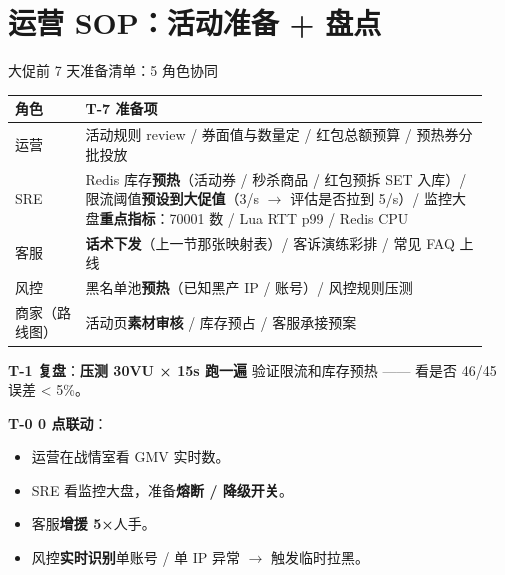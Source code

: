 \documentclass[aspectratio=169,11pt]{beamer}
\begin{document}
\section{运营 SOP：活动准备 + 盘点}

\begin{frame}[allowframebreaks]{大促前 7 天准备清单：5 角色协同}
\scriptsize
\begin{tabular}{@{}p{0.14\linewidth}p{0.80\linewidth}@{}}
\toprule
角色 & T-7 准备项 \\
\midrule
运营 & 活动规则 review / 券面值与数量定 / 红包总额预算 / 预热券分批投放 \\
SRE & Redis 库存\textbf{预热}（活动券 / 秒杀商品 / 红包预拆 SET 入库）/ 限流阈值\textbf{预设到大促值}（3/s $\to$ 评估是否拉到 5/s）/ 监控大盘\textbf{重点指标}：70001 数 / Lua RTT p99 / Redis CPU \\
客服 & \textbf{话术下发}（上一节那张映射表）/ 客诉演练彩排 / 常见 FAQ 上线 \\
风控 & 黑名单池\textbf{预热}（已知黑产 IP / 账号）/ 风控规则压测 \\
商家（路线图）& 活动页\textbf{素材审核} / 库存预占 / 客服承接预案 \\
\bottomrule
\end{tabular}
\smallskip

\footnotesize\textbf{T-1 复盘}：\textbf{压测 30VU × 15s 跑一遍} 验证限流和库存预热 —— 看是否 46/45 误差 < 5\%。

\textbf{T-0 0 点联动}：
\begin{itemize}\itemsep0pt
  \item 运营在战情室看 GMV 实时数。
  \item SRE 看监控大盘，准备\textbf{熔断 / 降级开关}。
  \item 客服\textbf{增援 5×}人手。
  \item 风控\textbf{实时识别}单账号 / 单 IP 异常 $\to$ 触发临时拉黑。
\end{itemize}
\end{frame}
\end{document}
